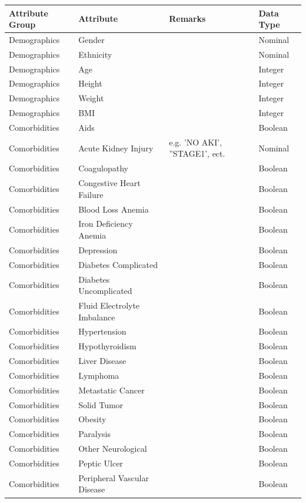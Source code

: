 \documentclass[conference,comsoc]{IEEEtran}
\begin{document}
\begin{longtable}[c]{C{0.2\textwidth} | C{0.2\textwidth} | C{0.4\textwidth} | C{0.2\textwidth}}

\textbf{Attribute Group} & \textbf{Attribute} & \textbf{Remarks} & \textbf{Data Type} \\
\midrule
Demographics & Gender & & Nominal \\
Demographics & Ethnicity & & Nominal \\
Demographics & Age & & Integer \\
Demographics & Height & & Integer \\
Demographics & Weight & & Integer \\
Demographics & BMI & & Integer \\
Comorbidities & Aids & & Boolean \\
Comorbidities & Acute Kidney Injury & e.g. 'NO AKI', ''STAGE1', ect. & Nominal \\
Comorbidities & Coagulopathy & & Boolean \\
Comorbidities & Congestive Heart Failure & & Boolean \\
Comorbidities & Blood Loss Anemia & & Boolean \\
Comorbidities & Iron Deficiency Anemia & & Boolean \\
Comorbidities & Depression & & Boolean \\
Comorbidities & Diabetes Complicated & & Boolean \\
Comorbidities & Diabetes Uncomplicated & & Boolean \\
Comorbidities & Fluid Electrolyte Imbalance     & & Boolean \\
Comorbidities & Hypertension & & Boolean \\
Comorbidities & Hypothyroidism & & Boolean \\
Comorbidities & Liver Disease & & Boolean \\
Comorbidities & Lymphoma & & Boolean \\
Comorbidities & Metastatic Cancer & & Boolean \\
Comorbidities & Solid Tumor & & Boolean \\
Comorbidities & Obesity & & Boolean \\
Comorbidities & Paralysis & & Boolean \\
Comorbidities & Other Neurological & & Boolean \\
Comorbidities & Peptic Ulcer & & Boolean \\
Comorbidities & Peripheral Vascular Disease & & Boolean \\

\end{longtable}
\end{document}
